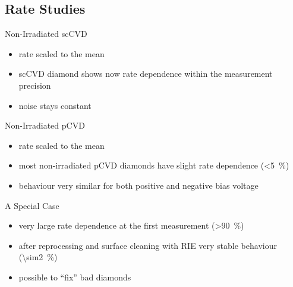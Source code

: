 \subsection{Rate Studies}
\begin{frame}{Non-Irradiated scCVD}

	
	\begin{itemize}\itemfill
		\item rate scaled to the mean
		\item scCVD diamond shows now rate dependence within the measurement precision
		\item noise stays constant
	\end{itemize}
	
\end{frame}
\begin{frame}{Non-Irradiated pCVD}
 
	
	\begin{itemize} \itemfill
		\item rate scaled to the mean
		\item most non-irradiated pCVD diamonds have slight rate dependence (\SI{<5}{\%})
		\item behaviour very similar for both positive and negative bias voltage
	\end{itemize}
 
\end{frame}
\begin{frame}{A Special Case}

	
	\begin{itemize}\itemfill
		\item very large rate dependence at the first measurement (\SI{>90}{\%})
		\item after reprocessing and surface cleaning with RIE very stable behaviour (\SI{\sim2}{\%})
		\item possible to ``fix'' bad diamonds
	\end{itemize}

\end{frame}
